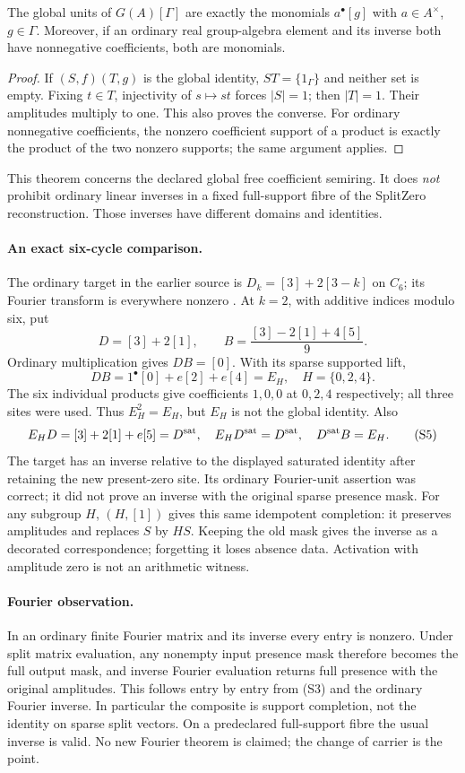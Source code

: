 \begin{theorem}
The global units of $G(A)[\Gamma]$ are exactly the monomials
$a^\bullet[g]$ with $a\in A^\times$, $g\in\Gamma$.
Moreover, if an ordinary real group-algebra element and its inverse both have
nonnegative coefficients, both are monomials.
\end{theorem}
\begin{proof}
If $(S,f)(T,g)$ is the global identity, $ST=\{1_\Gamma\}$ and neither set is
empty. Fixing $t\in T$, injectivity of $s\mapsto st$ forces $|S|=1$; then
$|T|=1$. Their amplitudes multiply to one. This also proves the converse.
For ordinary nonnegative coefficients, the nonzero coefficient support of a
product is exactly the product of the two nonzero supports; the same argument
applies.
\end{proof}
This theorem concerns the declared global free coefficient semiring. It does
\emph{not} prohibit ordinary linear inverses in a fixed full-support fibre of
the SplitZero reconstruction. Those inverses have different domains and identities.

\paragraph{An exact six-cycle comparison.}
The ordinary target in the earlier source is $D_k=[3]+2[3-k]$ on $C_6$;
its Fourier transform is everywhere nonzero \cite[Abstract]{Center}.
At $k=2$, with additive indices modulo six, put
\[
 D=[3]+2[1],\qquad B=\frac{[3]-2[1]+4[5]}9.
\]
Ordinary multiplication gives $DB=[0]$. With its sparse supported lift,
\[
 \boxed{DB=1^\bullet[0]+e[2]+e[4]=E_H,\quad H=\{0,2,4\}.}
 \tag{S4}
\]
The six individual products give coefficients $1,0,0$ at $0,2,4$ respectively;
all three sites were used. Thus $E_H^2=E_H$, but $E_H$ is not the global identity.
Also
\[
 E_HD=[3]+2[1]+e[5]=D^{\rm sat},\quad
 E_HD^{\rm sat}=D^{\rm sat},\quad D^{\rm sat}B=E_H.
 \tag{S5}
\]
The target has an inverse relative to the displayed saturated identity after
retaining the new present-zero site. Its ordinary Fourier-unit assertion was
correct; it did not prove an inverse with the original sparse presence mask.
For any subgroup $H$, $(H,[1])$ gives this same idempotent completion:
it preserves amplitudes and replaces $S$ by $HS$. Keeping the old mask gives
the inverse as a decorated correspondence; forgetting it loses absence data.
Activation with amplitude zero is not an arithmetic witness.

\paragraph{Fourier observation.}
In an ordinary finite Fourier matrix and its inverse every entry is nonzero.
Under split matrix evaluation, any nonempty input presence mask therefore
becomes the full output mask, and inverse Fourier evaluation returns full
presence with the original amplitudes. This follows entry by entry from (S3)
and the ordinary Fourier inverse. In particular the composite is support
completion, not the identity on sparse split vectors. On a predeclared
full-support fibre the usual inverse is valid. No new Fourier theorem is
claimed; the change of carrier is the point.

